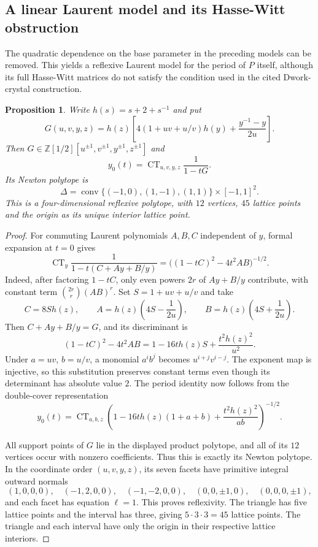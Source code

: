 \documentclass[11pt]{amsart}
\newtheorem{proposition}[theorem]{Proposition}
\theoremstyle{definition}
\theoremstyle{remark}
\begin{document}
\subsection{A linear Laurent model and its Hasse-Witt obstruction}\label{sec:linear}

The quadratic dependence on the base parameter in the preceding models can
be removed.  This yields a reflexive Laurent model for the period of $P$
itself, although its full Hasse-Witt matrices do not satisfy the condition
used in the cited Dwork-crystal construction.

\begin{proposition}\label{prop:linear-laurent}
Write $h(s)=s+2+s^{-1}$ and put
\[
 G(u,v,y,z)=h(z)\left[4(1+uv+u/v)h(y)
                         +\frac{y^{-1}-y}{2u}\right].
\]
Then $G\in\mathbb Z[1/2][u^{\pm1},v^{\pm1},y^{\pm1},z^{\pm1}]$ and
\[
 y_0(t)=\operatorname{CT}_{u,v,y,z}\frac1{1-tG}.
\]
Its Newton polytope is
\[
 \Delta=\operatorname{conv}\{(-1,0),(1,-1),(1,1)\}\times[-1,1]^2.
\]
This is a four-dimensional reflexive polytope, with $12$ vertices,
$45$ lattice points and the origin as its unique interior lattice point.
\end{proposition}

\begin{proof}
For commuting Laurent polynomials $A,B,C$ independent of $y$,
formal expansion at $t=0$ gives
\[
 \operatorname{CT}_y\frac1{1-t(C+Ay+B/y)}
 =\bigl((1-tC)^2-4t^2AB\bigr)^{-1/2}.
\]
Indeed, after factoring $1-tC$, only even powers $2r$ of $Ay+B/y$
contribute, with constant term $\binom{2r}{r}(AB)^r$.
Set $S=1+uv+u/v$ and take
\[
 C=8S h(z),\qquad A=h(z)\left(4S-\frac1{2u}\right),
 \qquad B=h(z)\left(4S+\frac1{2u}\right).
\]
Then $C+Ay+B/y=G$, and its discriminant is
\[
 (1-tC)^2-4t^2AB
 =1-16t h(z)S+\frac{t^2h(z)^2}{u^2}.
\]
Under $a=uv$, $b=u/v$, a monomial $a^i b^j$ becomes
$u^{i+j}v^{i-j}$.  The exponent map is injective, so this substitution
preserves constant terms even though its determinant has absolute value $2$.
The period identity now follows from the double-cover representation
\[
 y_0(t)=\operatorname{CT}_{a,b,z}
 \left(1-16t h(z)(1+a+b)+\frac{t^2h(z)^2}{ab}\right)^{-1/2}.
\]

All support points of $G$ lie in the displayed product polytope, and all
of its $12$ vertices occur with nonzero coefficients.  Thus this is
exactly its Newton polytope.  In the coordinate order $(u,v,y,z)$,
its seven facets have primitive integral outward normals
\[
 (1,0,0,0),\quad(-1,2,0,0),\quad(-1,-2,0,0),\quad
 (0,0,\pm1,0),\quad(0,0,0,\pm1),
\]
and each facet has equation $\ell=1$.  This proves reflexivity.
The triangle has five lattice points and the interval has three, giving
$5\cdot3\cdot3=45$ lattice points.  The triangle and each interval have
only the origin in their respective lattice interiors.
\end{proof}
\end{document}
